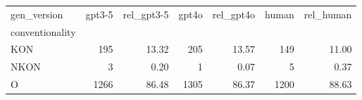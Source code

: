 \begin{tabular}{lrrrrrr}
\toprule
gen_version & gpt3-5 & rel_gpt3-5 & gpt4o & rel_gpt4o & human & rel_human \\
conventionality &  &  &  &  &  &  \\
\midrule
KON & 195 & 13.32 & 205 & 13.57 & 149 & 11.00 \\
NKON & 3 & 0.20 & 1 & 0.07 & 5 & 0.37 \\
O & 1266 & 86.48 & 1305 & 86.37 & 1200 & 88.63 \\
\bottomrule
\end{tabular}
